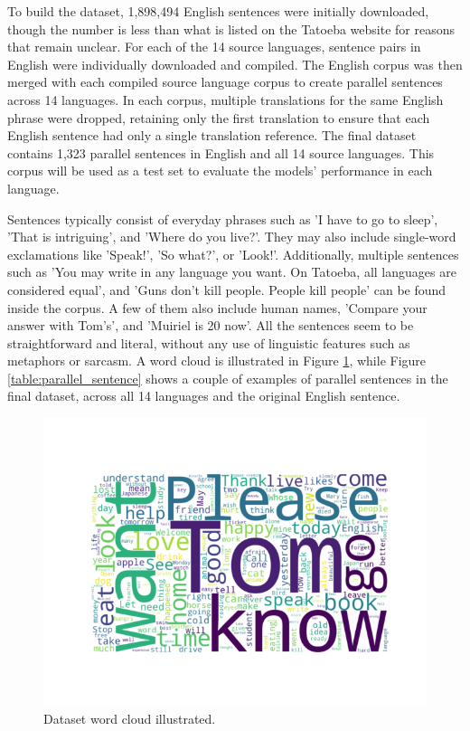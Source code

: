 \documentclass[a4paper, 11pt]{article}
\begin{document}
To build the dataset, 1,898,494 English sentences were initially downloaded, though the number is less than what is listed on the Tatoeba website for reasons that remain unclear. For each of the 14 source languages, sentence pairs in English were individually downloaded and compiled. The English corpus was then merged with each compiled source language corpus to create parallel sentences across 14 languages. In each corpus, multiple translations for the same English phrase were dropped, retaining only the first translation to ensure that each English sentence had only a single translation reference. The final dataset contains 1,323 parallel sentences in English and all 14 source languages. This corpus will be used as a test set to evaluate the models' performance in each language.

Sentences typically consist of everyday phrases such as 'I have to go to sleep', 'That is intriguing', and 'Where do you live?'. They may also include single-word exclamations like 'Speak!', 'So what?', or 'Look!'. Additionally, multiple sentences such as 'You may write in any language you want. On Tatoeba, all languages are considered equal', and 'Guns don't kill people. People kill people' can be found inside the corpus. A few of them also include human names, 'Compare your answer with Tom's', and 'Muiriel is 20 now'. All the sentences seem to be straightforward and literal, without any use of linguistic features such as metaphors or sarcasm. A word cloud is illustrated in Figure \ref{fig:wordcloud}, while Figure \ref{table:parallel_sentence} shows a couple of examples of parallel sentences in the final dataset, across all 14 languages and the original English sentence.


\begin{figure}[htbp]
    \centering
    \includegraphics[width=0.9\linewidth]{figures/wordcloud.png}
    \caption{Dataset word cloud illustrated.}
    \label{fig:wordcloud}
\end{figure}
\end{document}
